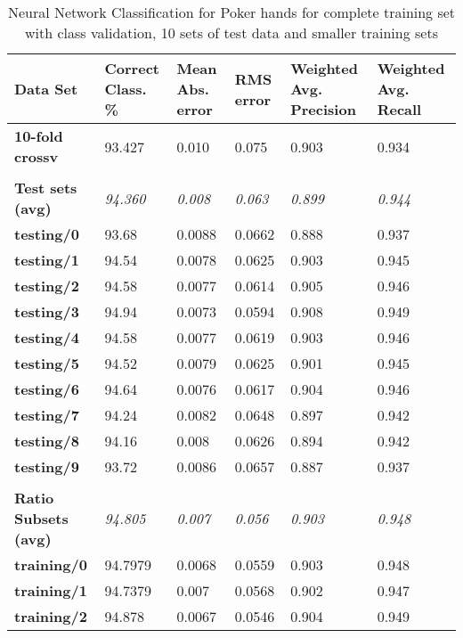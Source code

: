 \documentclass[10pt, a4paper]{article}
\begin{document}
\begin{table}[htbp]
  \centering
  \begin{tabular}{p{3cm}p{1.5cm}p{1.5cm}p{1.5cm}p{1.5cm}p{1.5cm}}
    \toprule
    \textbf{Data Set} & Correct Class. \% & Mean Abs. error & RMS error & Weighted Avg. Precision & Weighted Avg. Recall \\
    \midrule
    \textbf{10-fold crossv} & 93.427 & 0.010 & 0.075 & 0.903 & 0.934 \\
    \textbf{} &       &       &       &       &  \\
    \textbf{Test sets (avg)} & \textit{94.360} & \textit{0.008} & \textit{0.063} & \textit{0.899} & \textit{0.944} \\
    \textbf{   testing/0} & 93.68 & 0.0088 & 0.0662 & 0.888 & 0.937 \\
    \textbf{   testing/1} & 94.54 & 0.0078 & 0.0625 & 0.903 & 0.945 \\
    \textbf{   testing/2} & 94.58 & 0.0077 & 0.0614 & 0.905 & 0.946 \\
    \textbf{   testing/3} & 94.94 & 0.0073 & 0.0594 & 0.908 & 0.949 \\
    \textbf{   testing/4} & 94.58 & 0.0077 & 0.0619 & 0.903 & 0.946 \\
    \textbf{   testing/5} & 94.52 & 0.0079 & 0.0625 & 0.901 & 0.945 \\
    \textbf{   testing/6} & 94.64 & 0.0076 & 0.0617 & 0.904 & 0.946 \\
    \textbf{   testing/7} & 94.24 & 0.0082 & 0.0648 & 0.897 & 0.942 \\
    \textbf{   testing/8} & 94.16 & 0.008 & 0.0626 & 0.894 & 0.942 \\
    \textbf{   testing/9} & 93.72 & 0.0086 & 0.0657 & 0.887 & 0.937 \\
    \textbf{} &       &       &       &       &  \\
    \textbf{Ratio Subsets (avg)} & \textit{94.805} & \textit{0.007} & \textit{0.056} & \textit{0.903} & \textit{0.948} \\
    \textbf{   training/0} & 94.7979 & 0.0068 & 0.0559 & 0.903 & 0.948 \\
    \textbf{   training/1} & 94.7379 & 0.007 & 0.0568 & 0.902 & 0.947 \\
    \textbf{   training/2} & 94.878 & 0.0067 & 0.0546 & 0.904 & 0.949 \\
    \bottomrule
    \end{tabular}%
\caption{Neural Network Classification for Poker hands for complete training set with class validation, 10 sets of test data and smaller training sets}   
  \label{tab:nnresults}%
\end{table}%
\end{document}
